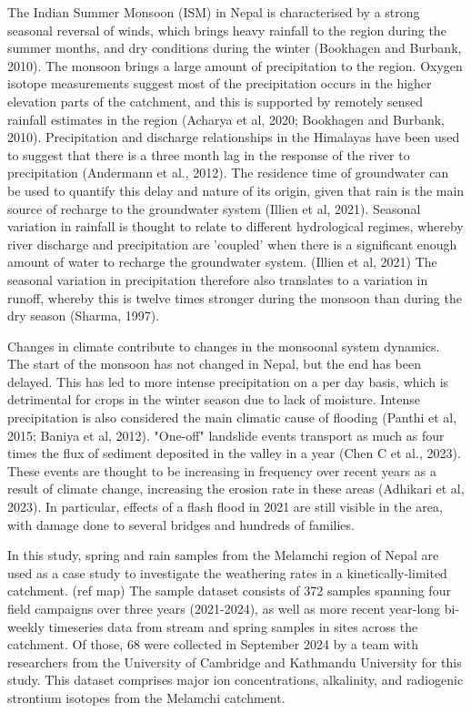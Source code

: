 The Indian Summer Monsoon (ISM) in Nepal is characterised by a strong seasonal reversal of winds, which brings heavy rainfall to the region during the summer months, and dry conditions during the winter (Bookhagen and Burbank, 2010). The monsoon brings a large amount of precipitation to the region. Oxygen isotope measurements suggest most of the precipitation occurs in the higher elevation parts of the catchment, and this is supported by remotely sensed rainfall estimates in the region (Acharya et al, 2020; Bookhagen and Burbank, 2010). Precipitation and discharge relationships in the Himalayas have been used to suggest that there is a three month lag in the response of the river to precipitation (Andermann et al., 2012). The residence time of groundwater can be used to quantify this delay and nature of its origin, given that rain is the main source of recharge to the groundwater system (Illien et al, 2021). Seasonal variation in rainfall is thought to relate to different hydrological regimes, whereby river discharge and precipitation are 'coupled' when there is a significant enough amount of water to recharge the groundwater system. (Illien et al, 2021) The seasonal variation in precipitation therefore also translates to a variation in runoff, whereby this is twelve times stronger during the monsoon than during the dry season (Sharma, 1997). 

\bsk

Changes in climate contribute to changes in the monsoonal system dynamics. The start of the monsoon has not changed in Nepal, but the end has been delayed. This has led to more intense precipitation on a per day basis, which is detrimental for crops in the winter season due to lack of moisture. Intense precipitation is also considered the main climatic cause of flooding (Panthi et al, 2015; Baniya et al, 2012). "One-off" landslide events transport as much as four times the flux of sediment deposited in the valley in a year (Chen C et al., 2023). These events are thought to be increasing in frequency over recent years as a result of climate change, increasing the erosion rate in these areas (Adhikari et al, 2023). In particular, effects of a flash flood in 2021 are still visible in the area, with damage done to several bridges and hundreds of families. 

\bsk

In this study, spring and rain samples from the Melamchi region of Nepal are used as a case study to investigate the weathering rates in a kinetically-limited catchment. (ref map) The sample dataset consists of 372 samples spanning four field campaigns over three years (2021-2024), as well as more recent year-long bi-weekly timeseries data from stream and spring samples in sites across the catchment. Of those, 68 were collected in September 2024 by a team with researchers from the University of Cambridge and Kathmandu University for this study. This dataset comprises major ion concentrations, alkalinity, and radiogenic strontium isotopes from the Melamchi catchment. 


